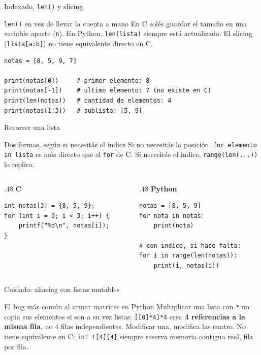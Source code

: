 \documentclass{beamer}
\begin{document}
\begin{frame}[fragile]{Indexado, \texttt{len()} y slicing}
  \begin{block}{\texttt{len()} en vez de llevar la cuenta a mano}
    En C solés guardar el tamaño en una variable aparte (\texttt{n}). En
    Python, \texttt{len(lista)} siempre está actualizado. El slicing
    (\texttt{lista[a:b]}) no tiene equivalente directo en C.
  \end{block}
  \begin{verbatim}
notas = [8, 5, 9, 7]

print(notas[0])     # primer elemento: 8
print(notas[-1])    # ultimo elemento: 7 (no existe en C)
print(len(notas))   # cantidad de elementos: 4
print(notas[1:3])   # sublista: [5, 9]
  \end{verbatim}
\end{frame}

\begin{frame}[fragile]{Recorrer una lista}
  \begin{block}{Dos formas, según si necesitás el índice}
    Si no necesitás la posición, \texttt{for elemento in lista} es más
    directo que el \texttt{for} de C. Si necesitás el índice, \texttt{range(len(...))} lo replica.
  \end{block}
  \begin{columns}[T]
    \begin{column}{.48\textwidth}
      \centering\textbf{C}
      \begin{verbatim}
int notas[3] = {8, 5, 9};
for (int i = 0; i < 3; i++) {
    printf("%d\n", notas[i]);
}
      \end{verbatim}
    \end{column}
    \begin{column}{.48\textwidth}
      \centering\textbf{Python}
      \begin{verbatim}
notas = [8, 5, 9]
for nota in notas:
    print(nota)

# con indice, si hace falta:
for i in range(len(notas)):
    print(i, notas[i])
      \end{verbatim}
    \end{column}
  \end{columns}
\end{frame}

\begin{frame}{Cuidado: aliasing con listas mutables}
  \begin{alertblock}{El bug más común al armar matrices en Python}
    Multiplicar una lista con \texttt{*} no copia sus elementos si son a
    su vez listas: \texttt{[[0]*4]*4} crea \textbf{4 referencias a la
    misma fila}, no 4 filas independientes. Modificar una, modifica las
    cuatro. No tiene equivalente en C: \texttt{int t[4][4]} siempre
    reserva memoria contigua real, fila por fila.
  \end{alertblock}
\end{frame}
\end{document}
